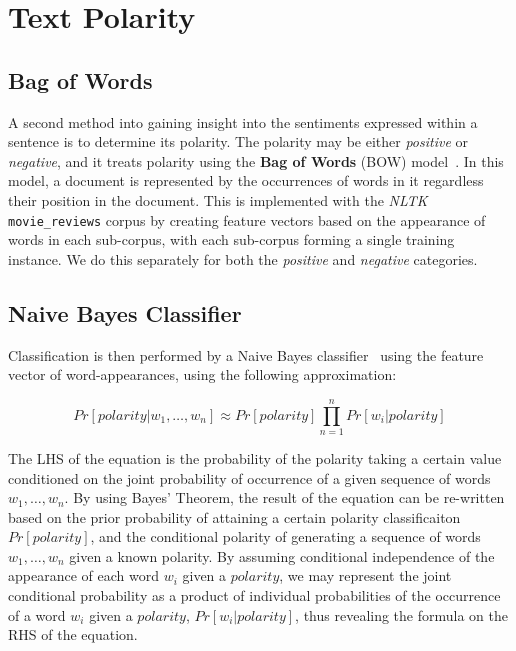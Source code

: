 \documentclass[11pt]{report} %
\begin{document}
\section{Text Polarity}
\label{section:text_polarity}
\subsection{Bag of Words}
A second method into gaining insight into the sentiments expressed within a sentence is to determine its polarity. The polarity may be either \textit{positive} or \textit{negative}, and it treats polarity using the \textbf{Bag of Words} (BOW) model~\cite{harris1954}. In this model, a document is represented by the occurrences of words in it regardless their position in the document. This is implemented with the \textit{NLTK} \verb|movie_reviews| corpus by creating feature vectors based on the appearance of words in each sub-corpus, with each sub-corpus forming a single training instance. We do this separately for both the \textit{positive} and \textit{negative} categories. 

\subsection{Naive Bayes Classifier}
Classification is then performed by a Naive Bayes classifier~\cite{lewis1998naive, mccallum1998comparison} using the feature vector of word-appearances, using the following approximation:

\begin{equation*} Pr[polarity | w_1, \dots, w_n] 	\approx	 Pr[polarity]  \prod_{n=1}^nPr[w_i|polarity] \end{equation*}

The LHS of the equation is the probability of the polarity taking a certain value conditioned on the joint probability of occurrence of a given sequence of words $w_1, \dots, w_n$. By using Bayes' Theorem, the result of the equation can be re-written based on the prior probability of attaining a certain polarity classificaiton $Pr[polarity]$, and the conditional polarity of generating a sequence of words $w_1, \dots, w_n$ given a known polarity. By assuming conditional independence of the appearance of each word $w_i$ given a $polarity$, we may represent the joint conditional probability as a product of individual probabilities of the occurrence of a word $w_i$ given a $polarity$, $Pr[w_i|polarity]$, thus revealing the formula on the RHS of the equation.
\end{document}
